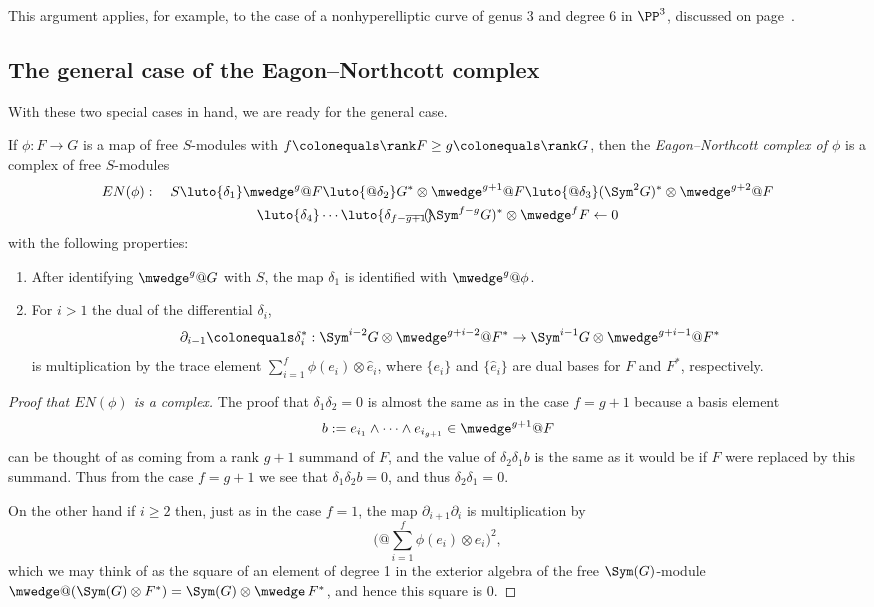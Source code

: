 This argument applies, for example,
to the case of a 
nonhyperelliptic curve 
%
of genus 3 and
degree 6 in $\PP^{3}$, discussed on page~\pageref{other genus 3}.

\subsection*{The general case of the Eagon--Northcott complex}

With these two special cases in hand, we are ready for the general
case. 

\begin{definition}
If $\phi: F\to G$ is a map of free $S$-modules with 
$f\colonequals \rank F\geq  g\colonequals  \rank G$, then the
\emph{Eagon--Northcott complex of $\phi$}
%
is a complex of free $S$-modules
\begin{multline*}
EN(\phi): \quad
S \luto{\delta_1}
\mwedge^g @F
\luto{@\delta_{2}}
G^*\otimes \mwedge^{g+1}@ F  \luto{@\delta_{3}}
(\Sym^2G)^*\otimes\mwedge^{g+2}@F  \\
\luto{\delta_{4}}\cdots\luto{\delta_{f-g+1}}\hskip-23pt-\hskip-4pt-
(\Sym^{f-g}G)^*\otimes\mwedge^fF
\leftarrow 0
\end{multline*}
with the following properties:
\begin{enumerate}

\item After identifying $\mwedge^{g}@G$ with $S$, the map $\delta_{1}$
is identified with $\mwedge^{g}@\phi$.

\item For $i>1$ the dual of the differential $\delta_{i}$,
$$
\partial_{i-1} \colonequals \delta_{i}^{*}: \Sym^{i-2}G \otimes \mwedge^{g+i-2}@F^{*} \to
\Sym^{i-1}G \otimes \mwedge^{g+i-1}@F^{*}
$$ 
is multiplication by the trace element
%
$\sum_{i = 1}^{f} \phi(e_{i}) \otimes \hat e_{i}$,
where
$\{e_{i}\}$ and $\{\hat e_{i}\}$ are dual bases for $F$ and $F^{*}$, respectively.
\end{enumerate}
\end{definition}

\begin{proof}[Proof that $EN(\phi)$ is a complex]
 The proof that $\delta_{1}\delta_{2} = 0$ is almost the same as in the
case $f = g+1$ because
a basis element
$$
b: = e_{i_{1}}\wedge \cdots \wedge e_{i_{g+1}} \in \mwedge^{g+1}@F
$$
can be thought of as coming from a rank $g+1$ summand of $F$, and the
value of $\delta_{2}\delta_{1}b$
is the same as it would be if $F$ were replaced by this summand. Thus
from the case $f=g+1$ we see
that $\delta_{1}\delta_{2}b = 0$, and thus $\delta_{2}\delta_{1} = 0$.

On the other hand if $i\geq 2$ then, just as in the case $f=1$,
 the map $\partial_{i+1}\partial_{i}$
is multiplication by
$$
\biggl(@\sum_{i = 1}^{f} \phi(e_{i}) \otimes \hat e_{i}\biggr)^{\!2},
$$
which we may think of as the square of an element of degree 1 in the
exterior algebra
of the free $\Sym(G)$-module $\mwedge@(\Sym(G)\otimes F^{*}) = \Sym(G)
\otimes \mwedge \,F^{*}$, and hence this square is 0.
\end{proof}

